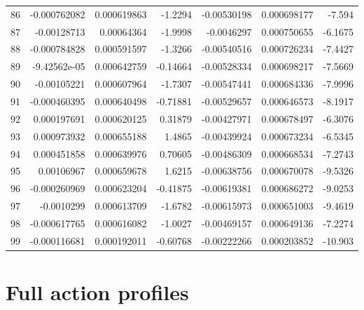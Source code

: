 \documentclass[10pt]{article}
\begin{document}
\begin{longtable}{rrrrrrr}
86 & -0.000762082 & 0.000619863 & -1.2294 & -0.00530198 & 0.000698177 & -7.594 \\
87 & -0.00128713 & 0.00064364 & -1.9998 & -0.0046297 & 0.000750655 & -6.1675 \\
88 & -0.000784828 & 0.000591597 & -1.3266 & -0.00540516 & 0.000726234 & -7.4427 \\
89 & -9.42562e-05 & 0.000642759 & -0.14664 & -0.00528334 & 0.000698217 & -7.5669 \\
90 & -0.00105221 & 0.000607964 & -1.7307 & -0.00547441 & 0.000684336 & -7.9996 \\
91 & -0.000460395 & 0.000640498 & -0.71881 & -0.00529657 & 0.000646573 & -8.1917 \\
92 & 0.000197691 & 0.000620125 & 0.31879 & -0.00427971 & 0.000678497 & -6.3076 \\
93 & 0.000973932 & 0.000655188 & 1.4865 & -0.00439924 & 0.000673234 & -6.5345 \\
94 & 0.000451858 & 0.000639976 & 0.70605 & -0.00486309 & 0.000668534 & -7.2743 \\
95 & 0.00106967 & 0.000659678 & 1.6215 & -0.00638756 & 0.000670078 & -9.5326 \\
96 & -0.000260969 & 0.000623204 & -0.41875 & -0.00619381 & 0.000686272 & -9.0253 \\
97 & -0.0010299 & 0.000613709 & -1.6782 & -0.00615973 & 0.000651003 & -9.4619 \\
98 & -0.000617765 & 0.000616082 & -1.0027 & -0.00469157 & 0.000649136 & -7.2274 \\
99 & -0.000116681 & 0.000192011 & -0.60768 & -0.00222266 & 0.000203852 & -10.903 \\
\bottomrule
\end{longtable}

\clearpage
\section{Full action profiles}
\end{document}
